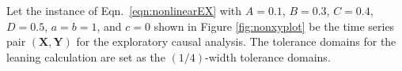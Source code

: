 Let the instance of Eqn.\ \ref{eqn:nonlinearEX} with $A=0.1$, $B=0.3$, $C=0.4$, $D=0.5$, $a=b=1$, and $c=0$ shown in Figure \ref{fig:nonxyplot} be the time series pair $(\mathbf{X},\mathbf{Y})$ for the exploratory causal analysis.  The tolerance domains for the leaning calculation are set as the $(1/4)$-width tolerance domains.

